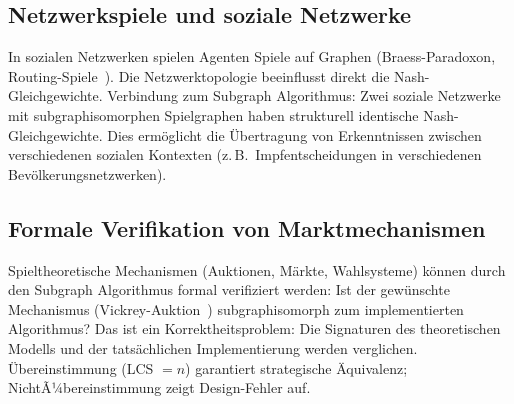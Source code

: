 ﻿\documentclass[a4paper,12pt]{article}
\theoremstyle{definition}
\begin{document}
\subsection{Netzwerkspiele und soziale Netzwerke}

In sozialen Netzwerken spielen Agenten Spiele auf Graphen (Braess-Paradoxon,
Routing-Spiele~\cite{roughgarden2005}). Die Netzwerktopologie beeinflusst
direkt die Nash-Gleichgewichte.
Verbindung zum Subgraph Algorithmus: Zwei soziale Netzwerke mit subgraphisomorphen
Spielgraphen haben strukturell identische Nash-Gleichgewichte.
Dies erm\"oglicht die \"Ubertragung von Erkenntnissen zwischen verschiedenen
sozialen Kontexten (z.\,B.\ Impfentscheidungen in verschiedenen
Bev\"olkerungsnetzwerken).

\subsection{Formale Verifikation von Marktmechanismen}

Spieltheoretische Mechanismen (Auktionen, M\"arkte, Wahlsysteme) k\"onnen
durch den Subgraph Algorithmus formal verifiziert werden:
Ist der gew\"unschte Mechanismus (Vickrey-Auktion~\cite{vickrey1961}) subgraphisomorph
zum implementierten Algorithmus?
Das ist ein Korrektheitsproblem: Die Signaturen des theoretischen Modells
und der tats\"achlichen Implementierung werden verglichen.
\"Ubereinstimmung (LCS $= n$) garantiert strategische \"Aquivalenz;
NichtÃ¼bereinstimmung zeigt Design-Fehler auf.
\end{document}
